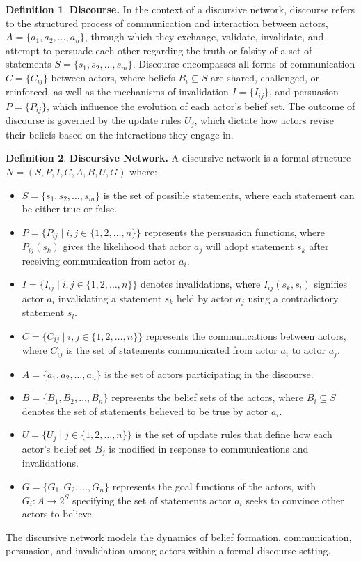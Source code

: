 \documentclass[12pt]{article}
\theoremstyle{definition}
\newtheorem{definition}{Definition}[section]
\begin{document}
\begin{definition}\label{def:discourse}
    \textbf{Discourse.} In the context of a discursive network, discourse refers to the structured process of communication and interaction between actors, $A = \{a_1, a_2, \ldots, a_n\}$, through which they exchange, validate, invalidate, and attempt to persuade each other regarding the truth or falsity of a set of statements $S = \{s_1, s_2, \ldots, s_m\}$. Discourse encompasses all forms of communication $C = \{C_{ij}\}$ between actors, where beliefs $B_i \subseteq S$ are shared, challenged, or reinforced, as well as the mechanisms of invalidation $I = \{I_{ij}\}$, and persuasion $P = \{P_{ij}\}$, which influence the evolution of each actor's belief set. The outcome of discourse is governed by the update rules $U_j$, which dictate how actors revise their beliefs based on the interactions they engage in.
    \end{definition}

\begin{definition}\label{def:discursive_network}
    \textbf{Discursive Network.} A discursive network is a formal structure $N = (S,P,I,C,A,B,U,G)$ where:
    \begin{itemize}
        \item $S = \{s_1, s_2, \ldots, s_m\}$ is the set of possible statements, where each statement can be either true or false.
        \item $P = \{P_{ij} \mid i, j \in \{1, 2, \ldots, n\}\}$ represents the persuasion functions, where $P_{ij}(s_k)$ gives the likelihood that actor $a_j$ will adopt statement $s_k$ after receiving communication from actor $a_i$.
        \item $I = \{I_{ij} \mid i, j \in \{1, 2, \ldots, n\}\}$ denotes invalidations, where $I_{ij}(s_k, s_l)$ signifies actor $a_i$ invalidating a statement $s_k$ held by actor $a_j$ using a contradictory statement $s_l$.
        \item $C = \{C_{ij} \mid i, j \in \{1, 2, \ldots, n\}\}$ represents the communications between actors, where $C_{ij}$ is the set of statements communicated from actor $a_i$ to actor $a_j$.
        \item $A = \{a_1, a_2, \ldots, a_n\}$ is the set of actors participating in the discourse.
        \item $B = \{B_1, B_2, \ldots, B_n\}$ represents the belief sets of the actors, where $B_i \subseteq S$ denotes the set of statements believed to be true by actor $a_i$.
        \item $U = \{U_j \mid j \in \{1, 2, \ldots, n\}\}$ is the set of update rules that define how each actor's belief set $B_j$ is modified in response to communications and invalidations.
        \item $G = \{G_1, G_2, \ldots, G_n\}$ represents the goal functions of the actors, with $G_i: A \to 2^S$ specifying the set of statements actor $a_i$ seeks to convince other actors to believe.
    \end{itemize}
    The discursive network models the dynamics of belief formation, communication, persuasion, and invalidation among actors within a formal discourse setting.
\end{definition}
\end{document}
